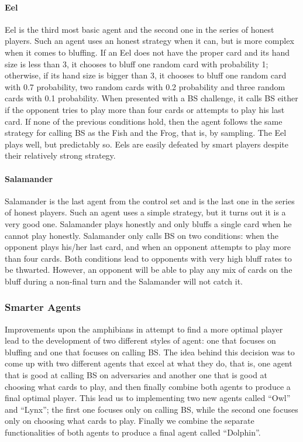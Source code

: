 \documentclass[a4paper,11pt]{article}
\begin{document}
	\paragraph{Eel}
Eel is the third most basic agent and the second one in the series of honest players. Such an agent uses an honest strategy when it can, but is more complex when it comes to bluffing. If an Eel does not have the proper card and its hand size is less than 3, it chooses to bluff one random card with probability 1; otherwise, if its hand size is bigger than 3, it chooses to bluff one random card with 0.7 probability, two random cards with 0.2 probability and three random cards with 0.1 probability. When presented with a BS challenge, it calls BS either if the opponent tries to play more than four cards or attempts to play his last card. If none of the previous conditions hold, then the agent follows the same strategy for calling BS as the Fish and the Frog, that is, by sampling. The Eel plays well, but predictably so. Eels are easily defeated by smart players despite their relatively strong strategy.

	\paragraph{Salamander}
	Salamander is the last agent from the control set and is the last one in the series of honest players. Such an agent uses a simple strategy, but it turns out it is a very good one. Salamander plays honestly and only bluffs a single card when he cannot play honestly. Salamander only calls BS on two conditions: when the opponent plays his/her last card, and when an opponent attempts to play more than four cards. Both conditions lead to opponents with very high bluff rates to be thwarted. However, an opponent will be able to play any mix of cards on the bluff during a non-final turn and the Salamander will not catch it. 
		
\subsubsection{Smarter Agents}
	Improvements upon the amphibians in attempt to find a more optimal player lead to the development of two different styles of agent: one that focuses on bluffing and one that focuses on calling BS. The idea behind this decision was to come up with two different agents that excel at what they do, that is, one agent that is good at calling BS on adversaries and another one that is good at choosing what cards to play, and then finally combine both agents to produce a final optimal player. This lead us to implementing two new agents called “Owl” and “Lynx”; the first one focuses only on calling BS, while the second one focuses only on choosing what cards to play. Finally we combine the separate functionalities of both agents to produce a final agent called “Dolphin”.
\end{document}
